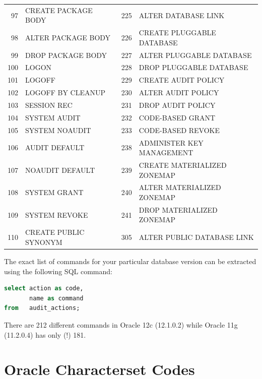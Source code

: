 \begin{appendix}
\begin{longtable}[]{@{}rl|rl@{}}
97   & CREATE PACKAGE BODY          & 225 & ALTER DATABASE LINK          \\
98   & ALTER PACKAGE BODY           & 226 & CREATE PLUGGABLE DATABASE    \\
99   & DROP PACKAGE BODY            & 227 & ALTER PLUGGABLE DATABASE     \\
100  & LOGON                        & 228 & DROP PLUGGABLE DATABASE      \\
101  & LOGOFF                       & 229 & CREATE AUDIT POLICY          \\
102  & LOGOFF BY CLEANUP            & 230 & ALTER AUDIT POLICY           \\
103  & SESSION REC                  & 231 & DROP AUDIT POLICY            \\
104  & SYSTEM AUDIT                 & 232 & CODE-BASED GRANT             \\
105  & SYSTEM NOAUDIT               & 233 & CODE-BASED REVOKE            \\
106  & AUDIT DEFAULT                & 238 & ADMINISTER KEY MANAGEMENT    \\
107  & NOAUDIT DEFAULT              & 239 & CREATE MATERIALIZED ZONEMAP  \\
108  & SYSTEM GRANT                 & 240 & ALTER MATERIALIZED ZONEMAP   \\
109  & SYSTEM REVOKE                & 241 & DROP MATERIALIZED ZONEMAP    \\
110  & CREATE PUBLIC SYNONYM        & 305 & ALTER PUBLIC DATABASE LINK   \\

\bottomrule
\end{longtable}

The exact list of commands for your particular database version can be
extracted using the following SQL command:

\begin{lstlisting}[language=SQL,caption={SQL Query to List Oracle Command Codes}]
select action as code,
       name as command
from   audit_actions;
\end{lstlisting}

There are 212 different commands in Oracle 12c (12.1.0.2) while Oracle
11g (11.2.0.4) has only (!) 181.

\chapter{Oracle Characterset Codes}\label{oracle-characterset-codes}


\end{appendix}
